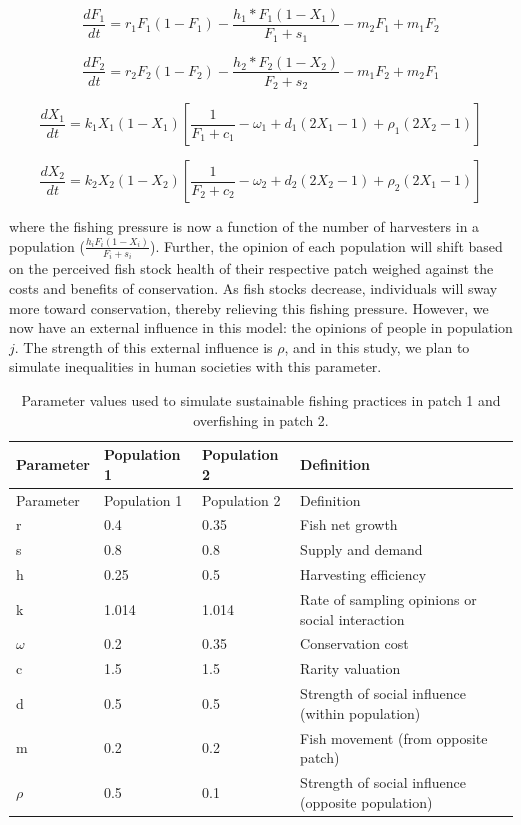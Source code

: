\documentclass[
  12pt,
]{article}
\begin{document}
\begin{equation}
\frac{dF_1}{dt} = r_1F_1(1-F_1)-\frac{h_1*F_1(1-X_1)}{F_1 + s_1} -m_2F_1 + m_1F_2
  \label{eq:FishWhole1}
\end{equation}

\begin{equation}
\frac{dF_2}{dt} = r_2F_2(1-F_2)-\frac{h_2*F_2(1-X_2)}{F_2 + s_2} -m_1F_2 + m_2F_1
  \label{eq:FishWhole2}
\end{equation}

\begin{equation}
\frac{dX_1}{dt} =  k_1X_1(1-X_1) [\frac{1}{F_1+c_1} - \omega_1 + d_1(2X_1 - 1) + \rho_1(2X_2 - 1)]
  \label{eq:SocWhole1}
\end{equation}

\begin{equation}
\frac{dX_2}{dt} = k_2X_2(1-X_2)  [\frac{1}{F_2+c_2} - \omega_2 + d_2(2X_2 - 1) +  \rho_2(2X_1 - 1)]
  \label{eq:SocWhole2}
\end{equation}

where the fishing pressure is now a function of the number of harvesters in a population (\(\frac{h_iF_i(1-X_i)}{F_i + s_i}\)). Further, the opinion of each population will shift based on the perceived fish stock health of their respective patch weighed against the costs and benefits of conservation. As fish stocks decrease, individuals will sway more toward conservation, thereby relieving this fishing pressure. However, we now have an external influence in this model: the opinions of people in population \(j\). The strength of this external influence is \(\rho\), and in this study, we plan to simulate inequalities in human societies with this parameter.



\begin{longtable}[]{@{}llll@{}}
\caption{\label{tab:DispersionParamTable}Parameter values used to simulate sustainable fishing practices in patch 1 and overfishing in patch 2. \label{DispersionParamTable}}\tabularnewline
\toprule()
Parameter & Population 1 & Population 2 & Definition \\
\midrule()
\endfirsthead
\toprule()
Parameter & Population 1 & Population 2 & Definition \\
\midrule()
\endhead
r & 0.4 & 0.35 & Fish net growth \\
s & 0.8 & 0.8 & Supply and demand \\
h & 0.25 & 0.5 & Harvesting efficiency \\
k & 1.014 & 1.014 & Rate of sampling opinions or social interaction \\
\(\omega\) & 0.2 & 0.35 & Conservation cost \\
c & 1.5 & 1.5 & Rarity valuation \\
d & 0.5 & 0.5 & Strength of social influence (within population) \\
m & 0.2 & 0.2 & Fish movement (from opposite patch) \\
\(\rho\) & 0.5 & 0.1 & Strength of social influence (opposite population) \\
\bottomrule()
\end{longtable}
\end{document}
